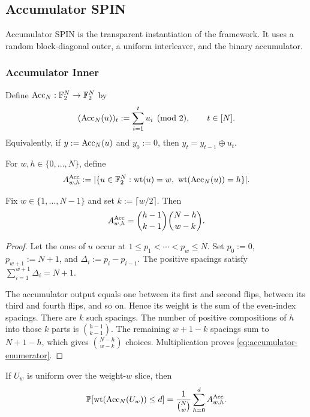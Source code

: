 \subsection{Accumulator SPIN}
\label{sec:accumulator-spin}

Accumulator SPIN is the transparent instantiation of the framework. It uses a
random block-diagonal outer, a uniform interleaver, and the binary
accumulator.

\subsubsection{Accumulator Inner}

Define $\operatorname{Acc}_N:\mathbb F_2^N\to\mathbb F_2^N$ by
\begin{equation}
  (\operatorname{Acc}_N(u))_t
  :=
  \sum_{i=1}^t u_i
  \pmod 2,
  \qquad t\in[N].
  \label{eq:accumulator-definition}
\end{equation}
Equivalently, if $y:=\operatorname{Acc}_N(u)$ and $y_0:=0$, then
$y_t=y_{t-1}\mathbin\oplus u_t$.

For $w,h\in\{0,\ldots,N\}$, define
\[
  A^{\operatorname{Acc}}_{w,h}
  :=
  |\{u\in\mathbb F_2^N:\operatorname{wt}(u)=w,\ \operatorname{wt}(\operatorname{Acc}_N(u))=h\}|.
\]

\begin{lemma}
\label{lem:accumulator-enumerator}
Fix $w\in\{1,\ldots,N-1\}$ and set $k:=\lceil w/2\rceil$. Then
\begin{equation}
  A^{\operatorname{Acc}}_{w,h}
  =
  \binom{h-1}{k-1}\binom{N-h}{w-k}.
  \label{eq:accumulator-enumerator}
\end{equation}
\end{lemma}

\begin{proof}
Let the ones of $u$ occur at
$1\le p_1<\cdots<p_w\le N$. Set $p_0:=0$, $p_{w+1}:=N+1$, and
$\Delta_i:=p_i-p_{i-1}$. The positive spacings satisfy
$\sum_{i=1}^{w+1}\Delta_i=N+1$.

The accumulator output equals one between its first and second flips, between
its third and fourth flips, and so on. Hence its weight is the sum of the
even-index spacings. There are $k$ such spacings. The number of positive
compositions of $h$ into those $k$ parts is
$\binom{h-1}{k-1}$. The remaining $w+1-k$ spacings sum to $N+1-h$,
which gives $\binom{N-h}{w-k}$ choices. Multiplication proves
\eqref{eq:accumulator-enumerator}.
\end{proof}

If $U_w$ is uniform over the weight-$w$ slice, then
\begin{equation}
  \mathbb P[\operatorname{wt}(\operatorname{Acc}_N(U_w))\le d]
  =
  \frac{1}{\binom Nw}
  \sum_{h=0}^d A^{\operatorname{Acc}}_{w,h}.
  \label{eq:accumulator-exact-tail}
\end{equation}

